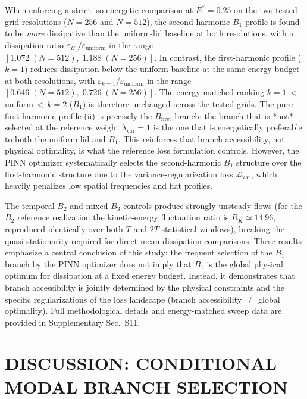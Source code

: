 \documentclass[a4paper,11pt]{article}
\begin{document}
When enforcing a strict iso-energetic comparison at \(E^*=0.25\) on the two tested
grid resolutions (\(N=256\) and \(N=512\)), the second-harmonic \(B_1\) profile is
found to be \emph{more} dissipative than the uniform-lid baseline at both
resolutions, with a dissipation ratio
\(\varepsilon_{B_1}/\varepsilon_{\mathrm{uniform}}\) in the range
\(\left[1.072\;(N=512),\;1.188\;(N=256)\right]\).
In contrast, the first-harmonic profile (\(k=1\)) reduces dissipation below the
uniform baseline at the same energy budget at both resolutions, with
\(\varepsilon_{k=1}/\varepsilon_{\mathrm{uniform}}\) in the range
\(\left[0.646\;(N=512),\;0.726\;(N=256)\right]\).
The energy-matched ranking $k=1$\,$<$\,uniform\,$<$\,$k=2$ ($B_1$) is therefore
unchanged across the tested grids. The pure first-harmonic profile (ii) is
precisely the \(B_{\mathrm{first}}\) branch: the branch that is *not* selected at
the reference weight \(\lambda_{\mathrm{var}}=1\) is the one that is energetically
preferable to both the uniform lid and \(B_1\). This reinforces that branch
accessibility, not physical optimality, is what the reference loss formulation
controls.
However, the PINN optimizer systematically selects the second-harmonic \(B_1\) structure over the
first-harmonic structure due to the variance-regularization loss \(\mathcal{L}_{\mathrm{var}}\),
which heavily penalizes low spatial frequencies and flat profiles.

The temporal \(B_2\) and mixed \(B_3\) controls produce strongly unsteady flows
(for the \(B_2\) reference realization the kinetic-energy fluctuation ratio is
\(R_K\simeq14.96\), reproduced identically over both \(T\) and \(2T\) statistical
windows), breaking the quasi-stationarity required for direct mean-dissipation
comparisons. These results emphasize a central conclusion of this study: the
frequent selection of the \(B_1\) branch by the PINN optimizer does not imply
that \(B_1\) is the global physical optimum for dissipation at a fixed energy budget.
Instead, it demonstrates that branch accessibility is jointly determined by the
physical constraints and the specific regularizations of the loss landscape
(branch accessibility \(\neq\) global optimality). Full methodological details and
energy-matched sweep data are provided in Supplementary Sec.~S11.

\section{DISCUSSION: CONDITIONAL MODAL BRANCH SELECTION}
\label{sec:discussion}
\end{document}
